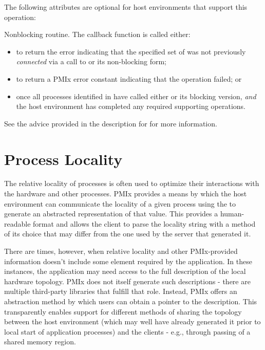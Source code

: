 The following attributes are optional for host environments that support this operation:


\optattrend

\descr

Nonblocking  routine. The callback function is called either:

\begin{itemize}
    \item to return the  error indicating that the specified set of  was not previously \textit{connected} via a call to  or its non-blocking form;

    \item to return a \ac{PMIx} error constant indicating that the operation failed; or

    \item once all processes identified in  have called either  or its blocking version, \textit{and} the host environment has completed any required supporting operations.
\end{itemize}

See the advice provided in the description for  for more information.


\section{Process Locality}
\label{chap:api_proc_mgmt:locality}

The relative locality of processes is often used to optimize their interactions with the hardware and other processes. \ac{PMIx} provides a means by which the host environment can communicate the locality of a given process using the  to generate an abstracted representation of that value. This provides a human-readable format and allows the client to parse the locality string with a method of its choice that may differ from the one used by the server that generated it.

There are times, however, when relative locality and other \ac{PMIx}-provided
information doesn't include some element required by the application. In these
instances, the application may need access to the full description of the
local hardware topology. \ac{PMIx} does not itself generate such descriptions
- there are multiple third-party libraries that fulfill that role. Instead,
\ac{PMIx} offers an abstraction method by which users can obtain a pointer to
the description. This transparently enables support for different methods of
sharing the topology between the host environment (which may well have already
generated it prior to local start of application processes) and the clients -
e.g., through passing of a shared memory region.

